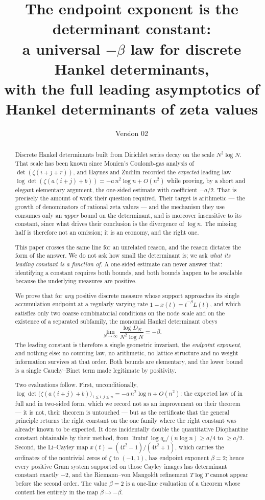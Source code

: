 \documentclass[11pt]{amsart}
\title[The endpoint exponent law]{The endpoint exponent is the determinant constant:\\
a universal $-\beta$ law for discrete Hankel determinants,\\
with the full leading asymptotics of Hankel determinants of zeta values}
\author{}
\date{Version 02}
\numberwithin{equation}{section}
\theoremstyle{plain}
\theoremstyle{definition}
\theoremstyle{remark}
\begin{document}
\begin{abstract}
Discrete Hankel determinants built from Dirichlet series decay on the scale $N^{2}\log N$.
That scale has been known since Monien's Coulomb-gas analysis of $\det(\zeta(i+j+r))$, and
Haynes and Zudilin recorded the \emph{expected} leading law
$\log\det(\zeta(a(i+j)+b))=-a\,n^{2}\log n+O(n^{2})$ while proving, by a short and elegant
elementary argument, the one-sided estimate with coefficient $-a/2$. That is precisely the amount
of work their question required. Their target is arithmetic --- the growth of denominators of
rational zeta values --- and the mechanism they use consumes only an \emph{upper} bound on the
determinant, and is moreover insensitive to its constant, since what drives their conclusion is the
divergence of $\log n$. The missing half is therefore not an omission; it is an economy, and the
right one.

This paper crosses the same line for an unrelated reason, and the reason dictates the form of the
answer. We do not ask how small the determinant is; we ask \emph{what its leading constant is a
function of}. A one-sided estimate can never answer that: identifying a constant requires both
bounds, and both bounds happen to be available because the underlying measures are positive.

We prove that for \emph{any} positive discrete measure whose support approaches its single
accumulation endpoint at a regularly varying rate
$1-x(t)=t^{-\beta}L(t)$, and which satisfies only two coarse combinatorial conditions on the
node scale and on the existence of a separated subfamily, the monomial Hankel determinant obeys
\[
\lim_{N\to\infty}\frac{\log D_{N}}{N^{2}\log N}=-\beta .
\]
The leading constant is therefore a single geometric invariant, the \emph{endpoint exponent},
and nothing else: no counting law, no arithmetic, no lattice structure and no weight
information survives at that order. Both bounds are elementary, and the lower bound is a single
Cauchy--Binet term made legitimate by positivity.

Two evaluations follow. First, unconditionally,
$\log\det\bigl(\zeta(a(i+j)+b)\bigr)_{1\le i,j\le n}=-a\,n^{2}\log n+O(n^{2})$: the expected law of
\cite{HaynesZudilin2015} in full and in two-sided form, which we record not as an improvement on
their theorem --- it is not, their theorem is untouched --- but as the certificate that the general
principle returns the right constant on the one family where the right constant was already known
to be expected. It does incidentally double the quantitative Diophantine constant obtainable by
their method, from $\liminf\log q_{n}/(n\log n)\ge a/4$ to $\ge a/2$. Second, the Li--Cayley
map $x(t)=(4t^{2}-1)/(4t^{2}+1)$, which carries the ordinates of the nontrivial zeros of $\zeta$
to $(-1,1)$, has endpoint exponent $\beta=2$; hence every positive Gram system supported on those
Cayley images has determinant constant exactly $-2$, and the Riemann--von Mangoldt refinement
$T\log T$ cannot appear before the second order. The value $\beta=2$ is a one-line evaluation of a
theorem whose content lies entirely in the map $\beta\mapsto-\beta$.


\end{abstract}
\end{document}

